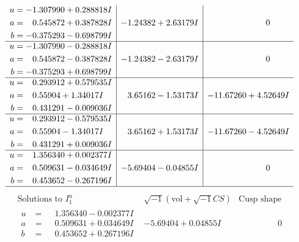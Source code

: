 \documentclass[1p]{elsarticle_modified}
\theoremstyle{definition}
\newcommand{\I}{\sqrt{-1}}
\begin{document}
$$\begin{array}{c|c|c}
\begin{aligned}
u &= -1.307990 + 0.288818 I \\
a &= \phantom{-}0.545872 + 0.387828 I \\
b &= -0.375293 - 0.698799 I\end{aligned}
 & -1.24382 + 2.63179 I & \phantom{-0.000000 } 0 \\ \hline\begin{aligned}
u &= -1.307990 - 0.288818 I \\
a &= \phantom{-}0.545872 - 0.387828 I \\
b &= -0.375293 + 0.698799 I\end{aligned}
 & -1.24382 - 2.63179 I & \phantom{-0.000000 } 0 \\ \hline\begin{aligned}
u &= \phantom{-}0.293912 + 0.579535 I \\
a &= \phantom{-}0.55904 + 1.34017 I \\
b &= \phantom{-}0.431291 - 0.009036 I\end{aligned}
 & \phantom{-}3.65162 - 1.53173 I & -11.67260 + 4.52649 I \\ \hline\begin{aligned}
u &= \phantom{-}0.293912 - 0.579535 I \\
a &= \phantom{-}0.55904 - 1.34017 I \\
b &= \phantom{-}0.431291 + 0.009036 I\end{aligned}
 & \phantom{-}3.65162 + 1.53173 I & -11.67260 - 4.52649 I \\ \hline\begin{aligned}
u &= \phantom{-}1.356340 + 0.002377 I \\
a &= \phantom{-}0.509631 - 0.034649 I \\
b &= \phantom{-}0.453652 - 0.267196 I\end{aligned}
 & -5.69404 - 0.04855 I & \phantom{-0.000000 } 0\\
 \hline 
 \end{array}$$\newpage$$\begin{array}{c|c|c}  
\text{Solutions to }I^u_{1}& \I (\text{vol} + \sqrt{-1}CS) & \text{Cusp shape}\\
 \hline 
\begin{aligned}
u &= \phantom{-}1.356340 - 0.002377 I \\
a &= \phantom{-}0.509631 + 0.034649 I \\
b &= \phantom{-}0.453652 + 0.267196 I\end{aligned}
 & -5.69404 + 0.04855 I & \phantom{-0.000000 } 0 \\ \hline\begin{aligned}

\end{aligned}
\end{array}$$
\end{document}
